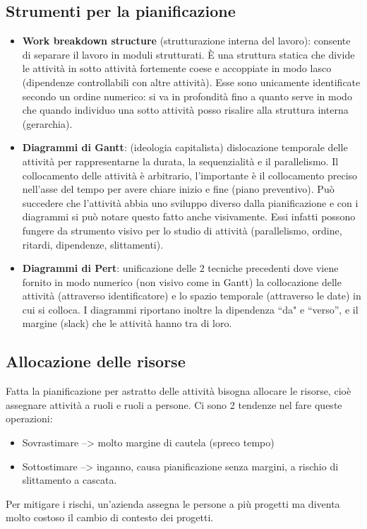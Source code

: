 \subsection{Strumenti per la pianificazione}
\begin{itemize}
\item \textbf{Work breakdown structure} (strutturazione interna del lavoro): consente di separare il lavoro in moduli strutturati. \`{E} una struttura statica che divide le attività in sotto attività fortemente coese e accoppiate in modo lasco (dipendenze controllabili con altre attività). Esse sono unicamente identificate secondo un ordine numerico: si va in profondità fino a quanto serve in modo che quando individuo una sotto attività posso risalire alla struttura interna (gerarchia).
\item \textbf{Diagrammi di Gantt}: (ideologia capitalista) dislocazione temporale delle attività per rappresentarne la
durata, la sequenzialità e il parallelismo. Il collocamento delle attività è arbitrario, l'importante è il collocamento preciso nell'asse del tempo per avere chiare inizio e fine (piano preventivo). Può succedere che l'attività abbia uno sviluppo diverso dalla pianificazione e con i diagrammi si può notare questo fatto anche visivamente. Essi infatti possono fungere da strumento visivo per lo studio di attività (parallelismo, ordine, ritardi, dipendenze, slittamenti).
\item \textbf{Diagrammi di Pert}: unificazione delle 2 tecniche precedenti dove viene fornito in modo numerico (non
visivo come in Gantt) la collocazione delle attività (attraverso identificatore) e lo spazio temporale (attraverso le date) in cui si colloca. I diagrammi riportano inoltre la dipendenza ``da" e ``verso'', e il margine (slack) che le attività hanno tra di loro.
\end{itemize}

\subsection{Allocazione delle risorse}
Fatta la pianificazione per astratto delle attività bisogna allocare le risorse, cioè assegnare attività a ruoli e ruoli a persone. Ci sono 2 tendenze nel fare queste operazioni:
\begin{itemize}
\item Sovrastimare --> molto margine di cautela (spreco tempo)
\item Sottostimare --> inganno, causa pianificazione senza margini, a rischio di slittamento a cascata.
\end{itemize}
Per mitigare i rischi, un'azienda assegna le persone a più progetti ma diventa molto costoso il cambio di contesto dei progetti.

